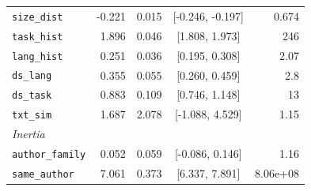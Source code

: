 \begin{table}[htbp]
\begin{tabular}{lrrcr}
\texttt{size\_dist} & -0.221 & 0.015 & [-0.246, -0.197] & 0.674 \\
\texttt{task\_hist} & 1.896 & 0.046 & [1.808, 1.973] & 246 \\
\texttt{lang\_hist} & 0.251 & 0.036 & [0.195, 0.308] & 2.07 \\
\texttt{ds\_lang} & 0.355 & 0.055 & [0.260, 0.459] & 2.8 \\
\texttt{ds\_task} & 0.883 & 0.109 & [0.746, 1.148] & 13 \\
\texttt{txt\_sim} & 1.687 & 2.078 & [-1.088, 4.529] & 1.15 \\
\midrule
\multicolumn{5}{l}{\textit{Inertia}} \\
\texttt{author\_family} & 0.052 & 0.059 & [-0.086, 0.146] & 1.16 \\
\texttt{same\_author} & 7.061 & 0.373 & [6.337, 7.891] & 8.06e+08 \\
\bottomrule
\end{tabular}
\end{table}
